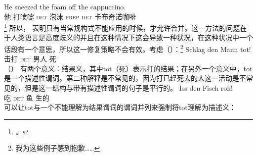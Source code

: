 \ea
\gll He sneezed the foam off the cappuccino.\\
     他 打喷嚏 \textsc{det} 泡沫 \textsc{prep} \textsc{det}  卡布奇诺咖啡\\
\footnote{%
 。
}
\z
所以， \citet[--320]{SvT2011a}表明只有当常规构式不能应用的时候，才允许合并。这一方法的问题在于人类语言是高度歧义的并且在这种情况下这会导致一种状况，在这种状况中一个话段有一个意思，所以这一修复策略不会有效。考虑（）：\footnote{%
  我为这些例子感到抱歉……
}
\ea
\label{ex-schlag-den-mann-tot}
\gll Schlag den Mann tot!\\
     击打   \textsc{det} 男人  死\\
\z
（） 有两个意义：结果义，其中tot（死）表示打的结果；在另外一个意义中，tot是一个描述性谓词。第二种解释是不常见的，因为打已经死去的人这一活动是不常见的，但是这一结构与带有描述性谓词的句子是平行的。
\ea
\gll Iss den Fisch roh!\\
     吃 \textsc{det} 鱼 生的\\
\z
可以让tot与一个不能理解为结果谓词的谓词并列来强制将tot理解为描述义：
